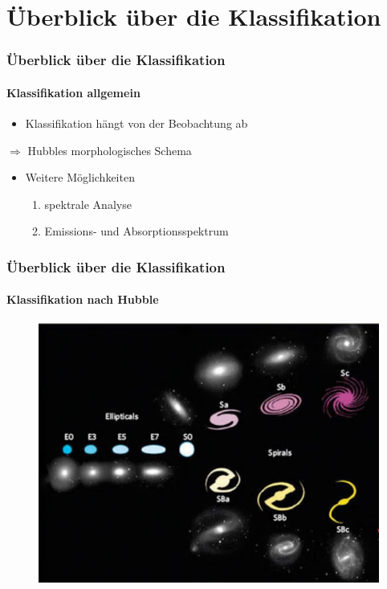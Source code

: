 








\begin{frame}
\titlepage
\end{frame}



\begin{frame}
\tableofcontents
\end{frame}


\section{Überblick über die Klassifikation}

\begin{frame}
\frametitle{Überblick über die Klassifikation}
\framesubtitle{Klassifikation allgemein}

\begin{itemize}
\item Klassifikation hängt von der Beobachtung ab
\end{itemize}
\qquad $\Rightarrow$ Hubbles morphologisches Schema



\begin{itemize}
\item Weitere Möglichkeiten
\begin{enumerate}
\item spektrale Analyse
\item Emissions- und Absorptionsspektrum
\end{enumerate}
\end{itemize}

\end{frame}


\begin{frame}
\frametitle{Überblick über die Klassifikation}
\framesubtitle{Klassifikation nach Hubble}
\begin{figure}
\includegraphics[scale=0.5]{Hubble_Entwicklung.jpg}
\end{figure}
\end{frame}


